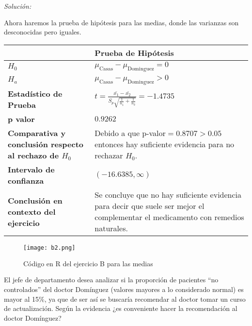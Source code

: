 \documentclass[12pt]{article}
\newenvironment{problem}[2][Problema]{\begin{trivlist}
\item[\hskip \labelsep {\bfseries #1}\hskip \labelsep {\bfseries #2.}]}{\end{trivlist}}
\newenvironment{sol}
    {\emph{Solución:}
    }
    {
    }
\begin{document}
\begin{sol}
Ahora haremos la prueba de hipótesis para las medias, donde las varianzas son desconocidas pero iguales.
\begin{table}[h!]
\centering
\begin{tabular}{|>{\raggedright\arraybackslash}m{6cm}|>{\raggedright\arraybackslash}m{6cm}|}
\hline
 & \textbf{Prueba de Hipótesis} \\ \hline
$H_0$ & $\mu_{\text{Casas}}-\mu_{\text{Dominguez}}=0$ \\ \hline
$H_a$ & $\mu_{\text{Casas}}-\mu_{\text{Dominguez}}>0$ \\ \hline
\textbf{Estadístico de Prueba} & \vspace{0.5cm}$t=\frac{\bar{x_1}-\bar{x_2}}{S_p\sqrt{\frac{1}{n_1}+\frac{1}{n_2}}}=-1.4735$\vspace{0.5cm} \\ \hline
\textbf{p valor} & $0.9262$ \\ \hline
\textbf{Comparativa y conclusión respecto al rechazo de $H_0$} & Debido a que p-valor$=0.8707>0.05$ entonces hay suficiente evidencia para no rechazar $H_0$. \\ \hline
\textbf{Intervalo de confianza} & $(-16.6385, \infty)$ \\ \hline
\textbf{Conclusión en contexto del ejercicio} & Se concluye que no hay suficiente evidencia para decir que suele ser mejor el complementar el medicamento con remedios naturales. \\ \hline
\end{tabular}
\label{tab:hipotesis}
\end{table}
\pagebreak
\begin{figure}[h]  %
    \centering      %
    \texttt{[image: b2.png]} 
    \caption{Código en R del ejercicio B para las medias}
\end{figure}
\end{sol}
\pagebreak
\begin{problem}{C}
El jefe de departamento desea analizar si la proporción de pacientes “no controlados” del doctor Domínguez (valores mayores a lo considerado normal) es mayor al 15\%, ya que de ser así se buscaría recomendar al doctor tomar un curso de actualización. Según la evidencia ¿es conveniente hacer la recomendación al doctor Domínguez?
\end{problem}
\end{document}
